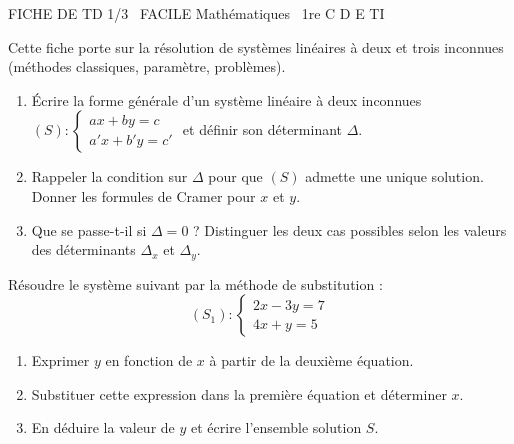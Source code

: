 \documentclass[11pt]{article}
\begin{document}
\begin{tcolorbox}[enhanced,colback=popink,colframe=popink,arc=10pt,boxrule=0pt,left=12pt,right=12pt,top=9pt,bottom=9pt]
{\color{white}\popxbold\small FICHE DE TD 1/3 \textbullet\ FACILE \hfill Mathématiques \textbullet\ 1re C D E TI\par}
\end{tcolorbox}
\vspace{4pt}
\noindent Cette fiche porte sur la résolution de systèmes linéaires à deux et trois inconnues (méthodes classiques, paramètre, problèmes).\\

\begin{exercice}
\begin{enumerate}
    \item Écrire la forme générale d'un système linéaire à deux inconnues $(S) : \begin{cases} a x + b y = c \\ a' x + b' y = c' \end{cases}$ et définir son déterminant $\Delta$.
    \item Rappeler la condition sur $\Delta$ pour que $(S)$ admette une unique solution. Donner les formules de Cramer pour $x$ et $y$.
    \item Que se passe-t-il si $\Delta = 0$ ? Distinguer les deux cas possibles selon les valeurs des déterminants $\Delta_x$ et $\Delta_y$.
\end{enumerate}
\end{exercice}

\begin{exercice}
Résoudre le système suivant par la méthode de substitution :
\[
(S_1) : \begin{cases} 2x - 3y = 7 \\ 4x + y = 5 \end{cases}
\]
\begin{enumerate}
    \item Exprimer $y$ en fonction de $x$ à partir de la deuxième équation.
    \item Substituer cette expression dans la première équation et déterminer $x$.
    \item En déduire la valeur de $y$ et écrire l'ensemble solution $S$.
\end{enumerate}
\end{exercice}
\end{document}
